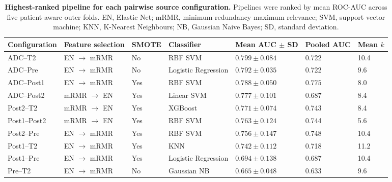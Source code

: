 \documentclass[12pt,twocolumn]{article}
\begin{document}
\begin{table}[htbp]
\centering
\caption{\textbf{Highest-ranked pipeline for each pairwise source
configuration.} Pipelines were ranked by mean ROC-AUC across five
patient-aware outer folds. EN, Elastic Net; mRMR, minimum redundancy
maximum relevance; SVM, support vector machine; KNN, K-Nearest
Neighbours; NB, Gaussian Naive Bayes; SD, standard deviation.}
\label{tab:pairwise_results}
\scriptsize

\begin{tabularx}{\textwidth}{
    p{1.9cm}
    p{2.6cm}
    p{1.1cm}
    p{2.3cm}
    p{2.4cm}
    p{1.8cm}
    X
}
\toprule
\textbf{Configuration} &
\textbf{Feature selection} &
\textbf{SMOTE} &
\textbf{Classifier} &
\textbf{Mean AUC \(\pm\) SD} &
\textbf{Pooled AUC} &
\textbf{Mean \(k\)} \\
\midrule

ADC--T2 &
EN \(\rightarrow\) mRMR &
No &
RBF SVM &
\(\mathbf{0.799 \pm 0.084}\) &
0.722 &
10.4 \\

ADC--Pre &
EN \(\rightarrow\) mRMR &
No &
Logistic Regression &
\(0.792 \pm 0.035\) &
0.722 &
9.6 \\

ADC--Post1 &
EN \(\rightarrow\) mRMR &
Yes &
RBF SVM &
\(0.788 \pm 0.050\) &
\(\mathbf{0.775}\) &
8.0 \\

ADC--Post2 &
mRMR \(\rightarrow\) EN &
Yes &
Linear SVM &
\(0.777 \pm 0.101\) &
0.687 &
8.4 \\

Post2--T2 &
mRMR \(\rightarrow\) EN &
Yes &
XGBoost &
\(0.771 \pm 0.074\) &
0.743 &
8.4 \\

Post1--Post2 &
mRMR \(\rightarrow\) EN &
Yes &
RBF SVM &
\(0.763 \pm 0.124\) &
0.744 &
5.6 \\

Post2--Pre &
EN \(\rightarrow\) mRMR &
Yes &
RBF SVM &
\(0.756 \pm 0.147\) &
0.748 &
10.4 \\

Post1--T2 &
EN \(\rightarrow\) mRMR &
Yes &
KNN &
\(0.742 \pm 0.112\) &
0.718 &
11.2 \\

Post1--Pre &
EN \(\rightarrow\) mRMR &
Yes &
Logistic Regression &
\(0.694 \pm 0.138\) &
0.687 &
10.4 \\

Pre--T2 &
EN \(\rightarrow\) mRMR &
No &
Gaussian NB &
\(0.665 \pm 0.048\) &
0.633 &
9.6 \\

\bottomrule
\end{tabularx}
\end{table}
\end{document}

